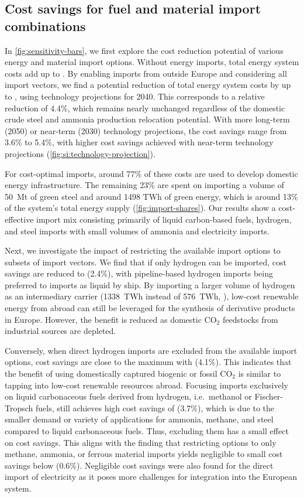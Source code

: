 \subsection*{Cost savings for fuel and material import combinations}
\label{sec:results-2}

In \cref{fig:sensitivity-bars}, we first explore the cost reduction potential of
various energy and material import options. Without energy imports, total energy
system costs add up to . By enabling imports from outside Europe and
considering all import vectors, we find a potential reduction of total energy
system costs by up to , using technology projections for 2040. This
corresponds to a relative reduction of 4.4\%, which remains nearly unchanged
regardless of the domestic crude steel and ammonia production relocation potential.
With more long-term (2050) or near-term (2030) technology projections, the cost
savings range from 3.6\% to 5.4\%, with higher cost savings achieved with
near-term technology projections (\cref{fig:si:technology-projection}).

For cost-optimal imports, around 77\% of these costs are used to develop
domestic energy infrastructure. The remaining 23\% are spent on importing a
volume of 50~Mt of green steel and around 1498 TWh of green energy, which is
around 13\% of the system's total energy supply (\cref{fig:import-shares}). Our
results show a cost-effective import mix consisting primarily of liquid
carbon-based fuels, hydrogen, and steel imports with small volumes of ammonia
and electricity imports.

Next, we investigate the impact of restricting the available import options to
subsets of import vectors. We find that if only hydrogen can be imported, cost
savings are reduced to  (2.4\%), with pipeline-based hydrogen imports
being preferred to imports as liquid by ship. By importing a larger volume of
hydrogen as an intermediary carrier (1338~TWh instead of 576~TWh,
), low-cost renewable energy from abroad can
still be leveraged for the synthesis of derivative products in Europe. However,
the benefit is reduced as domestic CO$_2$ feedstocks from industrial sources are
depleted.

Conversely, when direct hydrogen imports are excluded from the available import
options, cost savings are close to the maximum with  (4.1\%). This
indicates that the benefit of using domestically captured biogenic or fossil
CO$_2$ is similar to tapping into low-cost renewable resources abroad. Focusing
imports exclusively on liquid carbonaceous fuels derived from hydrogen,
i.e.~methanol or Fischer-Tropsch fuels, still achieves high cost savings of
 (3.7\%), which is due to the smaller demand or variety of
applications for ammonia, methane, and steel compared to liquid carbonaceous
fuels. Thus, excluding them has a small effect on cost savings. This aligns with
the finding that restricting options to only methane, ammonia, or ferrous
material imports yields negligible to small cost savings below 
(0.6\%). Negligible cost savings were also found for the direct import of
electricity as it poses more challenges for integration into the European
system.

